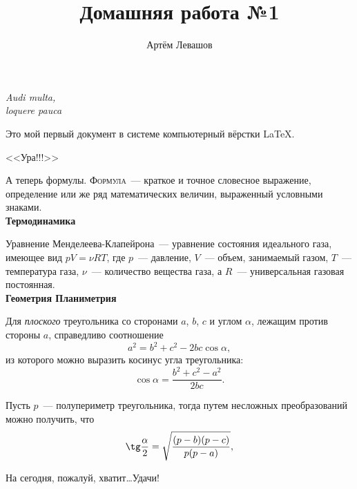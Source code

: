 \documentclass[12pt]{article}
\title{Домашняя работа №1}
\author{Артём Левашов}
\date{}
\begin{document}
	\maketitle
	\begin{flushright}
		{\itshape Audi multa,\\loquere pauca}
	\end{flushright}
	
	\vspace{20pt}
	Это мой первый документ в системе компьютерный вёрстки \LaTeX.
	\begin{center}
		\textsf{\huge{<<Ура!!!>>}}
	\end{center}
	\par А теперь формулы. \textsc{Формула}~--- краткое и точное словесное выражение, 
	определение или же ряд математических величин, выраженный условными знаками.
	\vspace{15pt}\\
	\hspace*{28pt}	
	\textbf{\large{Термодинамика}}
	\par Уравнение Менделеева-Клапейрона~--- уравнение состояния идеального газа,
	имеющее вид $pV = \nu RT$, где $p$~--- давление, $V$~--- объем, занимаемый газом, 
	$T$~--- температура газа, $\nu$~--- количество вещества газа, а $R$~--- универсальная 
	газовая постоянная.
	\vspace{15pt}\\
	\hspace*{28pt} \textbf{\large{Геометрия \hfill Планиметрия}}
	\par Для \textsl{плоского} треугольника со сторонами $a$, $b$, $c$ и углом $\alpha$, 
	лежащим против стороны $a$, справедливо соотношение
	\[
		a^2 = b^2 + c^2 - 2bc\cos\alpha,
	\]
	из которого можно выразить косинус угла треугольника:
	\[
		\cos\alpha = \frac{b^2 + c^2 - a^2}{2bc}.
	\]
	\par Пусть $p$~--- полупериметр треугольника, тогда путем несложных преобразований
	можно получить, что
	\[
		\tg\frac{\alpha}{2} = \sqrt{\frac{(p-b)(p-c)}{p(p-a)}},
	\]
	
	\vspace{1cm}
	\hspace*{-1.5pc}На сегодня, пожалуй, хватит\dots Удачи!
\end{document}
